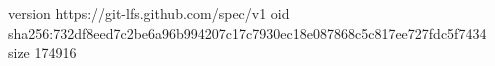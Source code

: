 version https://git-lfs.github.com/spec/v1
oid sha256:732df8eed7c2be6a96b994207c17c7930ec18e087868c5c817ee727fdc5f7434
size 174916
